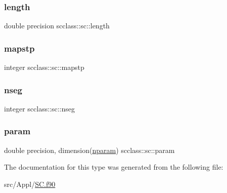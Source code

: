\subsubsection{\texorpdfstring{length}{length}}
{\footnotesize\ttfamily double precision scclass\+::sc\+::length}

\mbox{\label{structscclass_1_1sc_ac919c69cd2bb089386f56a5ac75728f0}} 
\subsubsection{\texorpdfstring{mapstp}{mapstp}}
{\footnotesize\ttfamily integer scclass\+::sc\+::mapstp}

\mbox{\label{structscclass_1_1sc_a32cf6178c767aecb2b10b7baa0221c78}} 
\subsubsection{\texorpdfstring{nseg}{nseg}}
{\footnotesize\ttfamily integer scclass\+::sc\+::nseg}

\mbox{\label{structscclass_1_1sc_a21e20d06bda8473fab959e3ee29e5183}} 
\subsubsection{\texorpdfstring{param}{param}}
{\footnotesize\ttfamily double precision, dimension(\mbox{\hyperlink{namespacescclass_a78eec9a89964d83818db291873df4436}{nparam}}) scclass\+::sc\+::param}



The documentation for this type was generated from the following file\+:\begin{DoxyCompactItemize}
\item 
src/\+Appl/\mbox{\hyperlink{_s_c_8f90}{S\+C.\+f90}}\end{DoxyCompactItemize}
